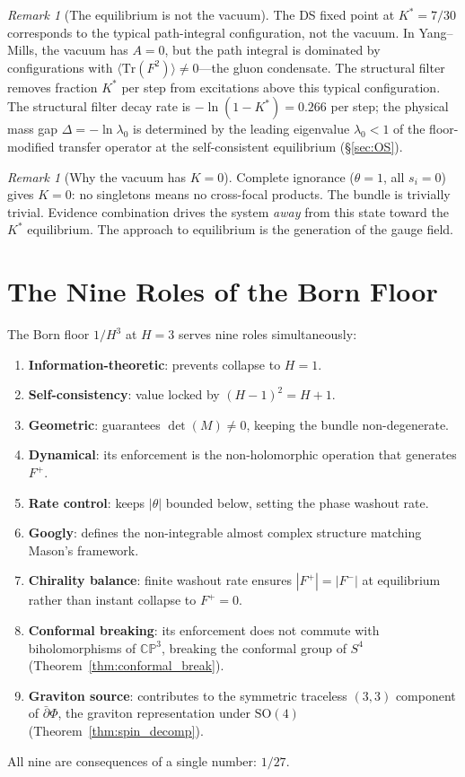 \documentclass[11pt,a4paper]{article}
\theoremstyle{definition}
\theoremstyle{remark}
\newtheorem{remark}[theorem]{Remark}
\newcommand{\CP}{\mathbb{CP}}
\newcommand{\dbar}{\bar{\partial}}
\newcommand{\Tr}{\mathrm{Tr}}
\begin{document}
\begin{remark}[The equilibrium is not the vacuum]
The DS fixed point at $K^*=7/30$ corresponds to the typical path-integral configuration, not the vacuum. In Yang--Mills, the vacuum has $A=0$, but the path integral is dominated by configurations with $\langle\Tr(F^2)\rangle\neq 0$---the gluon condensate. The structural filter removes fraction $K^*$ per step from excitations above this typical configuration. The structural filter decay rate is $-\ln(1-K^*)=0.266$ per step; the physical mass gap $\Delta=-\ln\lambda_0$ is determined by the leading eigenvalue $\lambda_0<1$ of the floor-modified transfer operator at the self-consistent equilibrium (\S\ref{sec:OS}).
\end{remark}

\begin{remark}[Why the vacuum has $K=0$]
Complete ignorance ($\theta=1$, all $s_i=0$) gives $K=0$: no singletons means no cross-focal products. The bundle is trivially trivial. Evidence combination drives the system \emph{away} from this state toward the $K^*$ equilibrium. The approach to equilibrium is the generation of the gauge field.
\end{remark}


\section{The Nine Roles of the Born Floor}\label{sec:roles}

The Born floor $1/H^3$ at $H=3$ serves nine roles simultaneously:
\begin{enumerate}[nosep]
\item \textbf{Information-theoretic}: prevents collapse to $H=1$.
\item \textbf{Self-consistency}: value locked by $(H-1)^2=H+1$.
\item \textbf{Geometric}: guarantees $\det(M)\neq 0$, keeping the bundle non-degenerate.
\item \textbf{Dynamical}: its enforcement is the non-holomorphic operation that generates $F^+$.
\item \textbf{Rate control}: keeps $|\theta|$ bounded below, setting the phase washout rate.
\item \textbf{Googly}: defines the non-integrable almost complex structure matching Mason's framework.
\item \textbf{Chirality balance}: finite washout rate ensures $|F^+|=|F^-|$ at equilibrium rather than instant collapse to $F^+=0$.
\item \textbf{Conformal breaking}: its enforcement does not commute with biholomorphisms of $\CP^3$, breaking the conformal group of $S^4$ (Theorem~\ref{thm:conformal_break}).
\item \textbf{Graviton source}: contributes to the symmetric traceless $(3,3)$ component of $\dbar\Phi$, the graviton representation under $\mathrm{SO}(4)$ (Theorem~\ref{thm:spin_decomp}).
\end{enumerate}
All nine are consequences of a single number: $1/27$.
\end{document}
